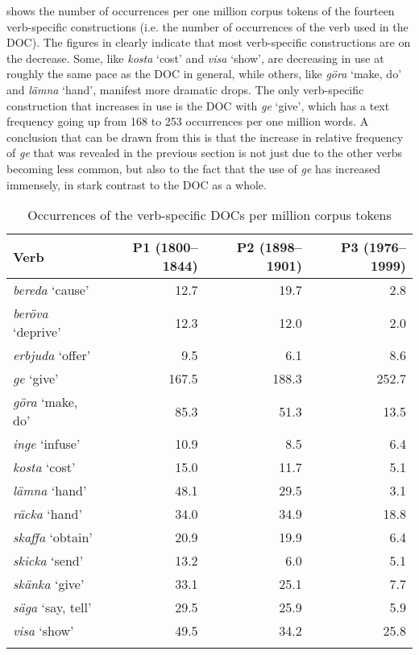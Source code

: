 \documentclass[output=paper]{langscibook}
\begin{document}
 shows the number of occurrences per one million corpus tokens of the fourteen verb-specific constructions (i.e. the number of occurrences of the verb used in the DOC). The figures in  clearly indicate that most verb-specific constructions are on the decrease. Some, like \textit{kosta} ‘cost’ and \textit{visa} ‘show’, are decreasing in use at roughly the same pace as the DOC in general, while others, like \textit{göra} ‘make, do’ and \textit{lämna} ‘hand’, manifest more dramatic drops. The only verb-specific construction that increases in use is the DOC with \textit{ge} ‘give’, which has a text frequency going up from 168 to 253 occurrences per one million words. A conclusion that can be drawn from this is that the increase in relative frequency of \textit{ge} that was revealed in the previous section is not just due to the other verbs becoming less common, but also to the fact that the use of \textit{ge} has increased immensely, in stark contrast to the DOC as a whole.


\begin{table}
\caption{Occurrences of the verb-specific DOCs per million corpus tokens}
\label{tab:valdeson:6}
\begin{tabularx}{.9\textwidth}{lrrr}
\lsptoprule
Verb & P1 (1800–1844) & P2 (1898–1901) & P3 (1976–1999)\\
\midrule
\textit{bereda} ‘cause’ & 12.7 & 19.7 & 2.8\\
\textit{beröva} ‘deprive’ & 12.3 & 12.0 & 2.0\\
\textit{erbjuda} ‘offer’ & 9.5 & 6.1 & 8.6\\
\textit{ge} ‘give’ & 167.5 & 188.3 & 252.7\\
\textit{göra} ‘make, do’ & 85.3 & 51.3 & 13.5\\
\textit{inge} ‘infuse’ & 10.9 & 8.5 & 6.4\\
\textit{kosta} ‘cost’ & 15.0 & 11.7 & 5.1\\
\textit{lämna} ‘hand’ & 48.1 & 29.5 & 3.1\\
\textit{räcka} ‘hand’ & 34.0 & 34.9 & 18.8\\
\textit{skaffa} ‘obtain’ & 20.9 & 19.9 & 6.4\\
\textit{skicka} ‘send’ & 13.2 & 6.0 & 5.1\\
\textit{skänka} ‘give’ & 33.1 & 25.1 & 7.7\\
\textit{säga} ‘say, tell’ & 29.5 & 25.9 & 5.9\\
\textit{visa} ‘show’ & 49.5 & 34.2 & 25.8\\
\lspbottomrule
\end{tabularx}
\end{table}
\end{document}
